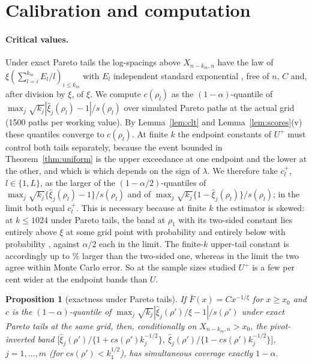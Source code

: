 \documentclass[11pt]{article}
\newtheorem{proposition}{Proposition}
\theoremstyle{definition}
\theoremstyle{remark}
\numberwithin{equation}{section}
\begin{document}
\section{Calibration and computation}\label{sec:computation}

\paragraph{Critical values.} Under exact Pareto tails the log-spacings above $X_{n-k_m,n}$ have the law of $\xi(\sum_{l=i}^{k_m}E_l/l)_{i\le k_m}$ with $E_l$ independent standard exponential \citep{renyi1953}, free of $n$, $C$ and, after division by $\xi$, of $\xi$. We compute $c(\rho_l)$ as the $(1-\alpha)$-quantile of $\max_j\sqrt{k_j}|\hat\xi_j(\rho_l)-1|/s(\rho_l)$ over simulated Pareto paths at the actual grid (1500 paths per working value). By Lemma~\ref{lem:clt} and Lemma~\ref{lem:scores}(v) these quantiles converge to $c(\rho_l)$. At finite $k$ the endpoint constants of $U^+$ must control both tails separately, because the event bounded in Theorem~\ref{thm:uniform} is the upper exceedance at one endpoint and the lower at the other, and which is which depends on the sign of $\lambda$. We therefore take $c^+_l$, $l\in\{1,L\}$, as the larger of the $(1-\alpha/2)$-quantiles of $\max_j\sqrt{k_j}\{\hat\xi_j(\rho_l)-1\}/s(\rho_l)$ and of $\max_j\sqrt{k_j}\{1-\hat\xi_j(\rho_l)\}/s(\rho_l)$; in the limit both equal $c_l^+$. This is necessary because at finite $k$ the estimator is skewed: at $k\le1024$ under Pareto tails, the band at $\rho_1$ with its two-sided constant lies entirely above $\xi$ at some grid point with probability \finUp{} and entirely below with probability \finDn, against $\alpha/2$ each in the limit. The finite-$k$ upper-tail constant is accordingly up to \finOneFactor\% larger than the two-sided one, whereas in the limit the two agree within Monte Carlo error. So at the sample sizes studied $U^+$ is a few per cent wider at the endpoint bands than $U$.

\begin{proposition}[exactness under Pareto tails]\label{prop:exact}
If $\bar F(x)=Cx^{-1/\xi}$ for $x\ge x_0$ and $c$ is the $(1-\alpha)$-quantile of $\max_j\sqrt{k_j}|\hat\xi_j(\rho')/\xi-1|/s(\rho')$ under exact Pareto tails at the same grid, then, conditionally on $X_{n-k_m,n}>x_0$, the pivot-inverted band
$\bigl[\hat\xi_j(\rho')/\{1+cs(\rho')k_j^{-1/2}\},\ \hat\xi_j(\rho')/\{1-cs(\rho')k_j^{-1/2}\}\bigr]$, $j=1,\dots,m$ (for $cs(\rho')<k_1^{1/2}$), has simultaneous coverage exactly $1-\alpha$.
\end{proposition}
\end{document}
